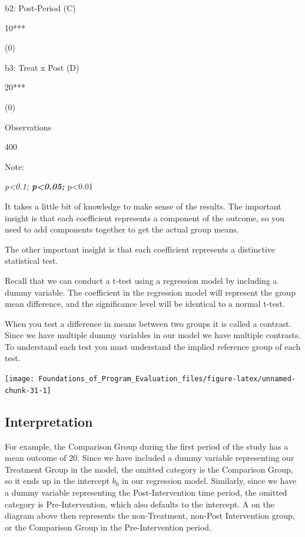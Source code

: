 \documentclass[]{book}
\theoremstyle{definition}
\theoremstyle{definition}
\theoremstyle{definition}
\theoremstyle{remark}
\begin{document}
b2: Post-Period (C)

10***

(0)

b3: Treat x Post (D)

20***

(0)

Observations

400

Note:

\emph{p\textless{}0.1; \textbf{p\textless{}0.05; }}p\textless{}0.01

It takes a little bit of knowledge to make sense of the results. The
important insight is that each coefficient represents a component of the
outcome, so you need to add components together to get the actual group
means.

The other important insight is that each coefficient represents a
distinctive statistical test.

Recall that we can conduct a t-test using a regression model by
including a dummy variable. The coefficient in the regression model will
represent the group mean difference, and the significance level will be
identical to a normal t-test.

When you test a difference in means between two groups it is called a
contrast. Since we have multiple dummy variables in our model we have
multiple contrasts. To understand each test you must understand the
implied reference group of each test.

\begin{center}\texttt{[image: Foundations\_of\_Program\_Evaluation\_files/figure-latex/unnamed-chunk-31-1]} \end{center}

\hypertarget{interpretation}{%
\subsection{Interpretation}\label{interpretation}}

For example, the Comparison Group during the first period of the study
has a mean outcome of 20. Since we have included a dummy variable
representing our Treatment Group in the model, the omitted category is
the Comparison Group, so it ends up in the intercept \(b_{0}\) in our
regression model. Similarly, since we have a dummy variable representing
the Post-Intervention time period, the omitted category is
Pre-Intervention, which also defaults to the intercept. A on the diagram
above then represents the non-Treatment, non-Post Intervention group, or
the Comparison Group in the Pre-Intervention period.
\end{document}
